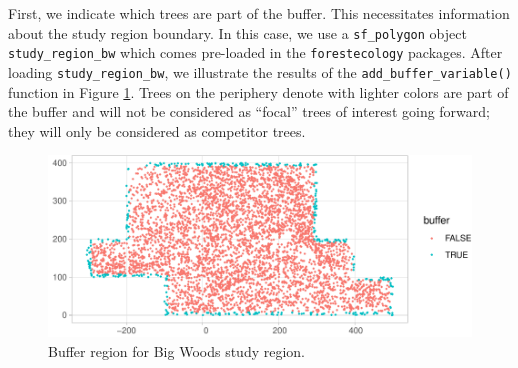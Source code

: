 \documentclass[12pt]{article}
\newenvironment{Shaded}{\begin{snugshade}}{\end{snugshade}}
\newcommand{\DataTypeTok}[1]{\textcolor[rgb]{0.13,0.29,0.53}{#1}}
\newcommand{\FloatTok}[1]{\textcolor[rgb]{0.00,0.00,0.81}{#1}}
\newcommand{\KeywordTok}[1]{\textcolor[rgb]{0.13,0.29,0.53}{\textbf{#1}}}
\newcommand{\NormalTok}[1]{#1}
\newcommand{\OperatorTok}[1]{\textcolor[rgb]{0.81,0.36,0.00}{\textbf{#1}}}
\newcommand{\StringTok}[1]{\textcolor[rgb]{0.31,0.60,0.02}{#1}}
\begin{document}
First, we indicate which trees are part of the buffer. This necessitates
information about the study region boundary. In this case, we use a
\texttt{sf\_polygon} object \texttt{study\_region\_bw} which comes
pre-loaded in the \texttt{forestecology} packages. After loading
\texttt{study\_region\_bw}, we illustrate the results of the
\texttt{add\_buffer\_variable()} function in Figure
\ref{fig:bw-define-buffer}. Trees on the periphery denote with lighter
colors are part of the buffer and will not be considered as ``focal''
trees of interest going forward; they will only be considered as
competitor trees.

\begin{Shaded}
\end{Shaded}

\begin{figure}

{\centering \includegraphics[width=1\linewidth]{Figures/bw-define-buffer-1} 

}

\caption{Buffer region for Big Woods study region.}\label{fig:bw-define-buffer}
\end{figure}
\end{document}

